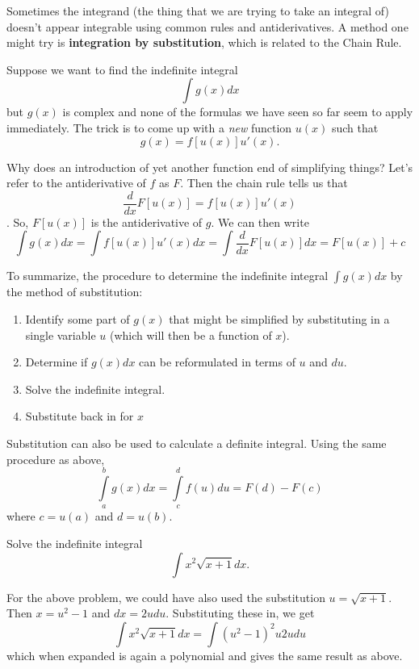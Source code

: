 \documentclass[]{book}
\providecommand{\tightlist}{%
  \setlength{\itemsep}{0pt}\setlength{\parskip}{0pt}}
\theoremstyle{definition}
\theoremstyle{definition}
\theoremstyle{definition}
\theoremstyle{remark}
\let\BeginKnitrBlock\begin \let\EndKnitrBlock\end
\begin{document}
Sometimes the integrand (the thing that we are trying to take an integral of) doesn't appear integrable using common rules and antiderivatives. A method one might try is \textbf{integration by substitution}, which is related to the Chain Rule.

Suppose we want to find the indefinite integral \[\int g(x)dx\] but \(g(x)\) is complex and none of the formulas we have seen so far seem to apply immediately. The trick is to come up with a \emph{new} function \(u(x)\) such that \[g(x)=f[u(x)]u'(x).\]

Why does an introduction of yet another function end of simplifying things? Let's refer to the antiderivative of \(f\) as \(F\). Then the chain rule tells us that \[\frac{d}{dx} F[u(x)]=f[u(x)]u'(x)\]. So, \(F[u(x)]\) is the antiderivative of \(g\). We can then write \[\int g(x) dx= \int f[u(x)]u'(x)dx = \int \frac{d}{dx} F[u(x)]dx = F[u(x)]+c\]

To summarize, the procedure to determine the indefinite integral \(\int g(x)dx\) by the method of substitution:

\begin{enumerate}
\def\labelenumi{\arabic{enumi}.}
\tightlist
\item
  Identify some part of \(g(x)\) that might be simplified by substituting in a single variable \(u\) (which will then be a function of \(x\)).
\item
  Determine if \(g(x)dx\) can be reformulated in terms of \(u\) and \(du\).
\item
  Solve the indefinite integral.
\item
  Substitute back in for \(x\)
\end{enumerate}

Substitution can also be used to calculate a definite integral. Using the same procedure as above, \[\int\limits_a^b g(x)dx=\int\limits_c^d f(u)du = F(d)-F(c)\]
where \(c=u(a)\) and \(d=u(b)\).

\BeginKnitrBlock{example}[Integration by Substitution I]
\protect\hypertarget{exm:intsub1}{}{\label{exm:intsub1} {} }
Solve the indefinite integral \[\int x^2 \sqrt{x+1}dx.\]
\EndKnitrBlock{example}

For the above problem, we could have also used the substitution \(u=\sqrt{x+1}\). Then \(x=u^2-1\) and \(dx=2u du\). Substituting these in, we get \[\int x^2\sqrt{x+1}dx=\int (u^2-1)^2 u 2u du\] which when expanded is again a polynomial and gives the same result as above.
\end{document}
